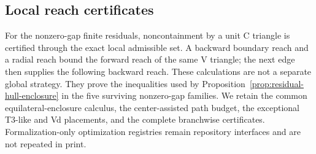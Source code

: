 \subsection{Local reach certificates}
\label{subsec:reach-certificates}

For the nonzero-gap finite residuals, noncontainment by a unit C triangle is
certified through the exact local admissible set.  A backward boundary reach
and a radial reach bound the forward reach of the same V triangle; the next
edge then supplies the following backward reach.  These calculations are not
a separate global strategy.  They prove the inequalities used by
Proposition~\ref{prop:residual-hull-enclosure} in the five surviving
nonzero-gap families.  We retain the common equilateral-enclosure calculus,
the center-assisted path budget, the exceptional T3-like and Vd placements,
and the complete branchwise certificates.  Formalization-only optimization
registries remain repository interfaces and are not repeated in print.

\begingroup
\let\PrintedSubsection\subsection
\let\PrintedSubsubsection\subsubsection
\let\PrintedParagraph\paragraph
\let\section\PrintedSubsection
\renewcommand{\subsection}[1]{\PrintedSubsubsection{#1}\leavevmode\par}
\renewcommand{\subsubsection}[1]{\PrintedParagraph{#1}\leavevmode\par}

\endgroup

\SignedCenterPropagation

